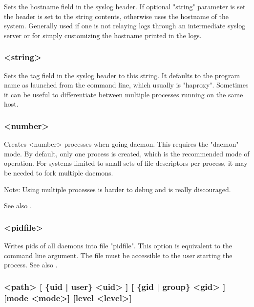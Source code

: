 Sets the hostname field in the syslog header. If optional "string" parameter
is set the header is set to the string contents, otherwise uses the hostname
of the system. Generally used if one is not relaying logs through an
intermediate syslog server or for simply customizing the hostname printed in
the logs.

\subsubsection[log-tag]{ <string>}

Sets the tag field in the syslog header to this string. It defaults to the
program name as launched from the command line, which usually is "haproxy".
Sometimes it can be useful to differentiate between multiple processes
running on the same host.

\subsubsection[nbproc]{ <number>}

Creates <number> processes when going daemon. This requires the "daemon"
mode. By default, only one process is created, which is the recommended mode
of operation. For systems limited to small sets of file descriptors per
process, it may be needed to fork multiple daemons.

\begin{note}{Note:}
Using multiple processes
is harder to debug and is really discouraged.
\end{note}

See also .

\subsubsection[pidfile]{ <pidfile>}

  Writes pids of all daemons into file "pidfile". This option is equivalent to
  the  command line argument. The file must be accessible to the user
  starting the process. See also .

\subsubsection[stats socket]{ <path> [ \{uid | user\} <uid> ] [ \{gid | group\} <gid> ] [mode <mode>] [level <level>]}

